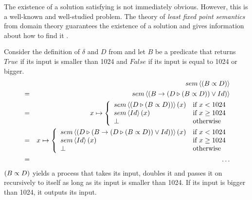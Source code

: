 The existence of a solution satisfying  is not immediately obvious. However, this is a well-known and well-studied problem. The theory of \textit{least fixed point semantics} from domain theory guarantees the existence of a solution and gives information about how to find it \cite{DenSem}.

\begin{example}
\label{exp:sem_repetition}
Consider the definition of $\delta$ and $D$ from  and let $B$ be a predicate that returns $True$ if its input is smaller than 1024 and $False$ if its input is equal to 1024 or bigger.
  \begin{eqnarray*}
  & & sem \left\langle \left( B \propto D \right) \right\rangle \\
    & = & sem \left\langle \left( B \to \left( D \triangleright \left( B \propto D \right) \right) \vee Id \right) \right\rangle \\
    & = & x \mapsto \left\{ \begin{array}{ll} 
                              sem \left\langle \left( D \triangleright \left( B \propto D \right) \right) \right\rangle \left( x \right) & \text{if } x < 1024 \\
                              sem \left\langle Id \right\rangle \left( x \right)                              & \text{if } x \geq 1024 \\
                              \bot                                                   & \text{otherwise}
                            \end{array}
                    \right. \\
    & = & x \mapsto \left\{ \begin{array}{ll} 
                              sem \left\langle \left( D \triangleright \left( B \to \left( D \triangleright \left( B \propto D \right) \right) \vee Id \right) \right) \right\rangle \left( x \right) & \text{if } x < 1024 \\
                              sem \left\langle Id \right\rangle \left( x \right)                              & \text{if } x \geq 1024 \\
                              \bot                                                   & \text{otherwise}
                            \end{array}
                    \right. \\
    & = & \ldots
  \end{eqnarray*}
$\left( B \propto D \right)$ yields a process that takes its input, doubles it and passes it on recursively to itself as long as its input is smaller than 1024. If its input is bigger than 1024, it outputs its input.
\end{example}


